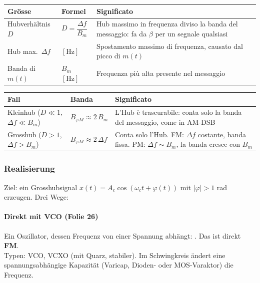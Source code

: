 
{\renewcommand{\arraystretch}{1.3}
\begin{tabularx}{\linewidth}{|>{\raggedright\arraybackslash}p{.22\linewidth}|>{\centering\arraybackslash}p{.24\linewidth}|>{\raggedright\arraybackslash}X|}
	\hline
	\textbf{Grösse} & \textbf{Formel} & \textbf{Significato} \\ \hline
	Hubverhältnis $D$ & $D=\dfrac{\Delta f}{B_m}$ & Hub massimo in frequenza diviso la banda del messaggio: fa da $\beta$ per un segnale qualsiasi \\ \hline
	Hub max.\ $\Delta f$ & $[\mathrm{Hz}]$ & Spostamento massimo di frequenza, causato dal picco di $m(t)$ \\ \hline
	Banda di $m(t)$ & $B_m$ \quad $[\mathrm{Hz}]$ & Frequenza più alta presente nel messaggio \\ \hline
\end{tabularx}}

{\renewcommand{\arraystretch}{1.3}
\begin{tabularx}{\linewidth}{|>{\raggedright\arraybackslash}p{.22\linewidth}|>{\centering\arraybackslash}p{.24\linewidth}|>{\raggedright\arraybackslash}X|}
	\hline
	\textbf{Fall} & \textbf{Banda} & \textbf{Significato} \\ \hline
	Kleinhub ($D\ll1$, $\Delta f\ll B_m$) & $B_{\varphi M}\approx 2\,B_m$ & L'Hub è trascurabile: conta solo la banda del messaggio, come in AM-DSB \\ \hline
	Grosshub ($D>1$, $\Delta f>B_m$) & $B_{\varphi M}\approx 2\,\Delta f$ & Conta solo l'Hub. FM: $\Delta f$ costante, banda fissa. PM: $\Delta f\sim B_m$, la banda cresce con $B_m$ \\ \hline
\end{tabularx}}

\subsubsection{Realisierung}
Ziel: ein Grosshubsignal $x(t)=A_c\cos(\omega_c t+\varphi(t))$ mit $|\varphi|>1$ rad erzeugen. Drei Wege:

\paragraph{Direkt mit VCO (Folie 26)}
Ein Oszillator, dessen Frequenz von einer Spannung abhängt: . Das ist direkt \textbf{FM}. \\
Typen: VCO, VCXO (mit Quarz, stabiler). Im Schwingkreis ändert eine spannungsabhängige Kapazität (Varicap, Dioden- oder MOS-Varaktor) die Frequenz.

